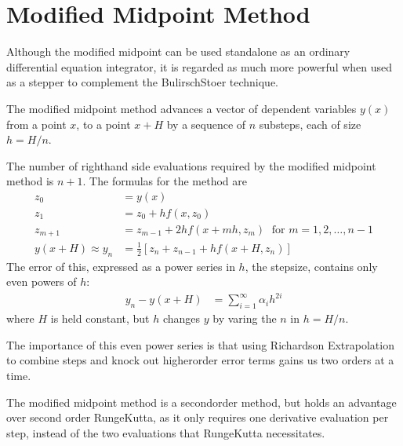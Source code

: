 \documentclass[letterpaper,10pt,english]{sphinxmanual}
\begin{document}
\ignorespaces 

\section{Modified Midpoint Method}
\label{\detokenize{bulirschStoer:modified-midpoint-method}}\label{\detokenize{bulirschStoer:mmdetail}}\label{\detokenize{bulirschStoer:index-0}}\label{\detokenize{bulirschStoer::doc}}
\sphinxAtStartPar
Although the modified midpoint can be used standalone as an ordinary differential equation integrator, it is regarded as much more powerful when used as a stepper to complement the Bulirsch\sphinxhyphen{}Stoer technique.

\sphinxAtStartPar
The modified midpoint method advances a vector of dependent variables \(y(x)\) from a point \(x\), to a point \(x + H\) by a sequence of \(n\) substeps, each of size \(h=H/n\).

\sphinxAtStartPar
The number of right\sphinxhyphen{}hand side evaluations required by the modified midpoint method is \(n+1\).  The formulas for the method are
\begin{equation*}
\begin{split}z_0 &= y(x) \\
z_1 &= z_0 + h f(x, z_0) \\
z_{m+1} &= z_{m-1} + 2 h f(x + m h, z_m)\; \text{ for } m = 1, 2, \dots, n-1 \\
y(x+H) \approx y_n &= \frac{1}{2} \left[ z_n + z_{n-1} + h f(x + H, z_n) \right]\end{split}
\end{equation*}
\sphinxAtStartPar
The error of this, expressed as a power series in \(h\), the stepsize, contains only even powers of \(h\):
\begin{equation*}
\begin{split}y_n - y(x + H) &= \sum_{i=1}^{\infty} \alpha_i h^{2i}\end{split}
\end{equation*}
\sphinxAtStartPar
where \(H\) is held constant, but \(h\) changes \(y\) by varing the \(n\) in \(h = H/n\).

\sphinxAtStartPar
The importance of this even power series is that using Richardson Extrapolation to combine steps and knock out higher\sphinxhyphen{}order error terms gains us two orders at a time.

\sphinxAtStartPar
The modified midpoint method is a second\sphinxhyphen{}order method, but holds an advantage over second order Runge\sphinxhyphen{}Kutta, as it only requires one derivative evaluation per step, instead of the two evaluations that Runge\sphinxhyphen{}Kutta necessitates.
\end{document}
